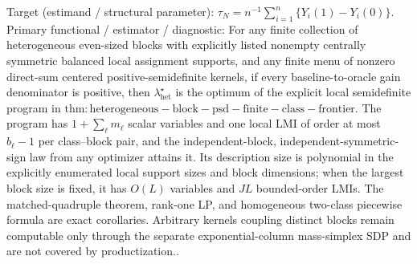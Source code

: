 \documentclass{article}
\begin{document}
Target (estimand / structural parameter): \(\tau_N=n^{-1}\sum_{i=1}^n\{Y_i(1)-Y_i(0)\}\).
Primary functional / estimator / diagnostic: For any finite collection of heterogeneous even-sized blocks with explicitly listed nonempty centrally symmetric balanced local assignment supports, and any finite menu of nonzero direct-sum centered positive-semidefinite kernels, if every baseline-to-oracle gain denominator is positive, then \(\lambda_{\mathrm{het}}^\star\) is the optimum of the explicit local semidefinite program in \(\mathrm{thm:heterogeneous-block-psd-finite-class-frontier}\).  The program has \(1+\sum_\ell m_\ell\) scalar variables and one local LMI of order at most \(b_\ell-1\) per class--block pair, and the independent-block, independent-symmetric-sign law from any optimizer attains it.  Its description size is polynomial in the explicitly enumerated local support sizes and block dimensions; when the largest block size is fixed, it has \(O(L)\) variables and \(JL\) bounded-order LMIs.  The matched-quadruple theorem, rank-one LP, and homogeneous two-class piecewise formula are exact corollaries.  Arbitrary kernels coupling distinct blocks remain computable only through the separate exponential-column mass-simplex SDP and are not covered by productization..
\end{document}
